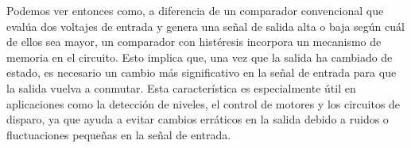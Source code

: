 \documentclass[11pt, a4paper]{article}
\begin{document}
Podemos ver entonces como, a diferencia de un comparador convencional que evalúa dos voltajes de entrada y genera una señal de salida alta o baja según cuál de ellos sea mayor, un comparador con histéresis incorpora un mecanismo de memoria en el circuito. Esto implica que, una vez que la salida ha cambiado de estado, es necesario un cambio más significativo en la señal de entrada para que la salida vuelva a conmutar. Esta característica es especialmente útil en aplicaciones como la detección de niveles, el control de motores y los circuitos de disparo, ya que ayuda a evitar cambios erráticos en la salida debido a ruidos o fluctuaciones pequeñas en la señal de entrada.
\end{document}
